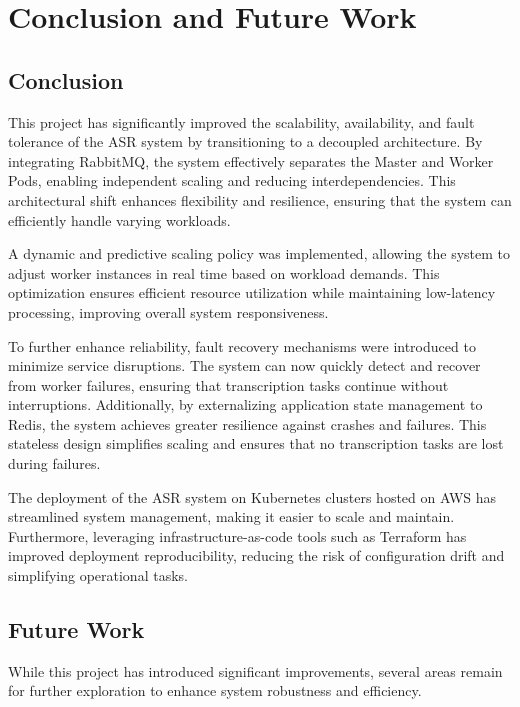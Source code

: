 \chapter{Conclusion and Future Work} \label{chapter:conclusion_and_future_work}

\section{Conclusion}

This project has significantly improved the scalability, availability, and fault tolerance of the ASR system by transitioning to a decoupled architecture. By integrating RabbitMQ, the system effectively separates the Master and Worker Pods, enabling independent scaling and reducing interdependencies. This architectural shift enhances flexibility and resilience, ensuring that the system can efficiently handle varying workloads.  

A dynamic and predictive scaling policy was implemented, allowing the system to adjust worker instances in real time based on workload demands. This optimization ensures efficient resource utilization while maintaining low-latency processing, improving overall system responsiveness.  

To further enhance reliability, fault recovery mechanisms were introduced to minimize service disruptions. The system can now quickly detect and recover from worker failures, ensuring that transcription tasks continue without interruptions. Additionally, by externalizing application state management to Redis, the system achieves greater resilience against crashes and failures. This stateless design simplifies scaling and ensures that no transcription tasks are lost during failures.  

The deployment of the ASR system on Kubernetes clusters hosted on AWS has streamlined system management, making it easier to scale and maintain. Furthermore, leveraging infrastructure-as-code tools such as Terraform has improved deployment reproducibility, reducing the risk of configuration drift and simplifying operational tasks.  

\section{Future Work}

While this project has introduced significant improvements, several areas remain for further exploration to enhance system robustness and efficiency.

